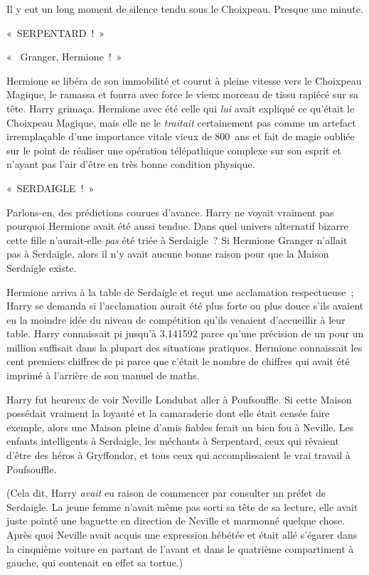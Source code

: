 Il y eut un long moment de silence tendu sous le Choixpeau. Presque une minute.

«~SERPENTARD~!~»

«~ Granger, Hermione~!~»

Hermione se libéra de son immobilité et courut à pleine vitesse vers le Choixpeau Magique, le ramassa et fourra avec force le vieux morceau de tissu rapiécé sur sa tête. Harry grimaça. Hermione avec été celle qui \emph{lui} avait expliqué ce qu'était le Choixpeau Magique, mais elle ne le \emph{traitait} certainement pas comme un artefact irremplaçable d'une importance vitale vieux de 800~ans et fait de magie oubliée sur le point de réaliser une opération télépathique complexe sur son esprit et n'ayant pas l'air d'être en très bonne condition physique.

«~SERDAIGLE~!~»

Parlons-en, des prédictions courues d'avance. Harry ne voyait vraiment pas pourquoi Hermione avait été aussi tendue. Dans quel univers alternatif bizarre cette fille n'aurait-elle \emph{pas} été triée à Serdaigle~? Si Hermione Granger n'allait pas à Serdaigle, alors il n'y avait aucune bonne raison pour que la Maison Serdaigle existe.

Hermione arriva à la table de Serdaigle et reçut une acclamation respectueuse~; Harry se demanda si l'acclamation aurait été plus forte ou plus douce s'ils avaient eu la moindre idée du niveau de compétition qu'ils venaient d'accueillir à leur table. Harry connaissait pi jusqu'à 3,141592 parce qu'une précision de un pour un million suffisait dans la plupart des situations pratiques. Hermione connaissait les cent premiers chiffres de pi parce que c'était le nombre de chiffres qui avait été imprimé à l'arrière de son manuel de maths.

Harry fut heureux de voir Neville Londubat aller à Poufsouffle. Si cette Maison possédait vraiment la loyauté et la camaraderie dont elle était censée faire exemple, alors une Maison pleine d'amis fiables ferait un bien fou à Neville. Les enfants intelligents à Serdaigle, les méchants à Serpentard, ceux qui rêvaient d'être des héros à Gryffondor, et tous ceux qui accomplissaient le vrai travail à Poufsouffle.

(Cela dit, Harry \emph{avait} eu raison de commencer par consulter un préfet de Serdaigle. La jeune femme n'avait même pas sorti sa tête de sa lecture, elle avait juste pointé une baguette en direction de Neville et marmonné quelque chose. Après quoi Neville avait acquis une expression hébétée et était allé s'égarer dans la cinquième voiture en partant de l'avant et dans le quatrième compartiment à gauche, qui contenait en effet sa tortue.)

